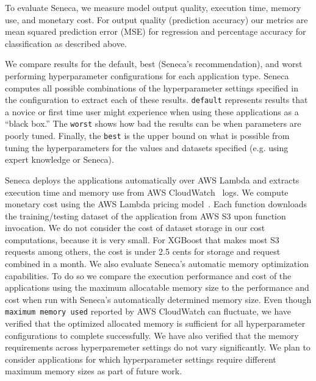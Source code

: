 To evaluate Seneca, we measure model output quality, execution time, memory
use, and monetary cost.  For output quality (prediction accuracy) our metrics
are mean squared prediction error (MSE) for regression and percentage accuracy for
classification as described above. 


We compare results for the default, best (Seneca's recommendation), and worst performing hyperparameter configurations for each application type. Seneca computes all possible combinations of the hyperparameter settings specified in the configuration to extract each of these results.  \texttt{default} represents results that a novice or first time user might experience when using these applications as a ``black box.''  The \texttt{worst} shows how bad the results can be when parameters are poorly tuned.  Finally, the \texttt{best} is the upper bound on what is possible from tuning the hyperparameters for the values and datasets specified  (e.g. using expert knowledge or Seneca). 

Seneca deploys the applications automatically over AWS Lambda
and extracts execution time and memory use from 
AWS CloudWatch~\cite{ref:awscloudwatch} logs.
We compute monetary cost using the AWS Lambda pricing model~\cite{ref:pricing}.
Each function downloads the training/testing dataset 
of the application from AWS S3 upon function invocation. 
We do not consider the cost of dataset storage 
in our cost computations, because it is very small. For XGBoost that makes most S3 requests among others, the cost is under 2.5 cents for storage and request combined in a month.
We also evaluate Seneca's automatic memory optimization capabilities.  To
do so we compare the execution performance and cost of the applications using
the maximum allocatable memory size to the performance and cost when run with
Seneca's automatically determined memory size. Even though \texttt{maximum memory used} reported by AWS CloudWatch can fluctuate, we 
have verified that the optimized allocated memory is sufficient for all 
hyperparameter configurations to complete successfully.  We have also verified
that the memory requirements across hyperparemeter settings do not vary 
significantly. We plan to consider applications for which hyperparameter settings require
different maximum memory sizes as part of future work.


